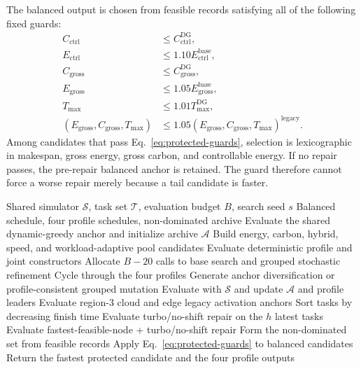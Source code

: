 \documentclass[preprint,12pt]{elsarticle}
\newcommand{\method}{H-CSMO\xspace}
\begin{document}
The balanced output is chosen from feasible records satisfying all of the following fixed guards:
\begin{align}
C_{\mathrm{ctrl}} &\le C_{\mathrm{ctrl}}^{\mathrm{DG}}, \\
E_{\mathrm{ctrl}} &\le 1.10 E_{\mathrm{ctrl}}^{\mathrm{base}}, \\
C_{\mathrm{gross}} &\le C_{\mathrm{gross}}^{\mathrm{DG}}, \\
E_{\mathrm{gross}} &\le 1.05 E_{\mathrm{gross}}^{\mathrm{base}}, \\
T_{\max} &\le 1.01 T_{\max}^{\mathrm{DG}}, \\
(E_{\mathrm{gross}},C_{\mathrm{gross}},T_{\max})
&\le 1.05(E_{\mathrm{gross}},C_{\mathrm{gross}},T_{\max})^{\mathrm{legacy}}.
\label{eq:protected-guards}
\end{align}
Among candidates that pass Eq.~\eqref{eq:protected-guards}, selection is lexicographic in makespan, gross energy, gross carbon, and controllable energy. If no repair passes, the pre-repair balanced anchor is retained. The guard therefore cannot force a worse repair merely because a tail candidate is faster.

\begin{algorithm}[t]
\caption{Guarded multi-profile search in \method}
\label{alg:hcsmo}
\begin{algorithmic}[1]
\Require Shared simulator $\mathcal{S}$, task set $\mathcal{T}$, evaluation budget $B$, search seed $s$
\Ensure Balanced schedule, four profile schedules, non-dominated archive
\State Evaluate the shared dynamic-greedy anchor and initialize archive $\mathcal{A}$
\State Build energy, carbon, hybrid, speed, and workload-adaptive pool candidates
\State Evaluate deterministic profile and joint constructors
\State Allocate $B-20$ calls to base search and grouped stochastic refinement
    \State Cycle through the four profiles
    \State Generate anchor diversification or profile-consistent grouped mutation
    \State Evaluate with $\mathcal{S}$ and update $\mathcal{A}$ and profile leaders
\EndWhile
\State Evaluate region-3 cloud and edge legacy activation anchors
    \State Sort tasks by decreasing finish time
        \State Evaluate turbo/no-shift repair on the $h$ latest tasks
        \State Evaluate fastest-feasible-node + turbo/no-shift repair
    \EndFor
\EndFor
\State Form the non-dominated set from feasible records
\State Apply Eq.~\eqref{eq:protected-guards} to balanced candidates
\State Return the fastest protected candidate and the four profile outputs
\end{algorithmic}
\end{algorithm}
\end{document}
